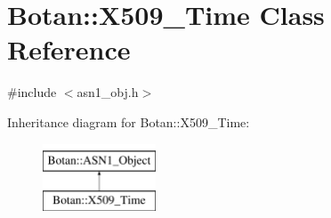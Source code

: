 \hypertarget{classBotan_1_1X509__Time}{\section{Botan\-:\-:X509\-\_\-\-Time Class Reference}
\label{classBotan_1_1X509__Time}
}


{\ttfamily \#include $<$asn1\-\_\-obj.\-h$>$}

Inheritance diagram for Botan\-:\-:X509\-\_\-\-Time\-:\begin{figure}[H]
\begin{center}
\leavevmode
\includegraphics[height=2.000000cm]{classBotan_1_1X509__Time}
\end{center}
\end{figure}
